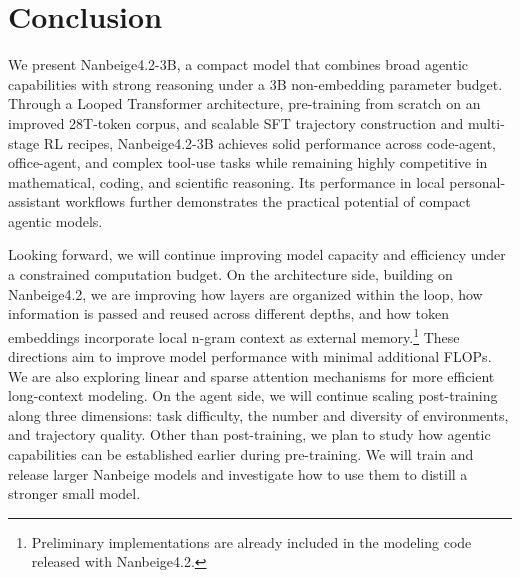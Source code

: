 \section{Conclusion}

We present Nanbeige4.2-3B, a compact model that combines broad agentic capabilities with strong reasoning under a 3B non-embedding parameter budget. Through a Looped Transformer architecture, pre-training from scratch on an improved 28T-token corpus, and scalable SFT trajectory construction and multi-stage RL recipes, Nanbeige4.2-3B achieves solid performance across code-agent, office-agent, and complex tool-use tasks while remaining highly competitive in mathematical, coding, and scientific reasoning. Its performance in local personal-assistant workflows further demonstrates the practical potential of compact agentic models.

Looking forward, we will continue improving model capacity and efficiency under a constrained computation budget. On the architecture side, building on Nanbeige4.2, we are improving how layers are organized within the loop, how information is passed and reused across different depths, and how token embeddings incorporate local n-gram context as external memory.\footnote{Preliminary implementations are already included in the modeling code released with Nanbeige4.2.} These directions aim to improve model performance with minimal additional FLOPs. We are also exploring linear and sparse attention mechanisms for more efficient long-context modeling. On the agent side, we will continue scaling post-training along three dimensions: task difficulty, the number and diversity of environments, and trajectory quality. Other than post-training, we plan to study how agentic capabilities can be established earlier during pre-training. We will train and release larger Nanbeige models and investigate how to use them to distill a stronger small model.
